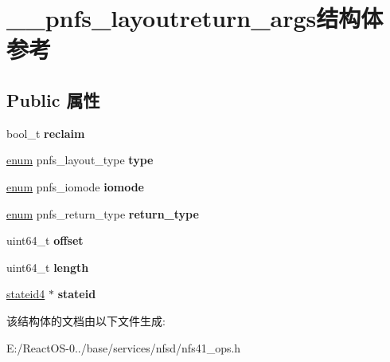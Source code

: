 \hypertarget{struct____pnfs__layoutreturn__args}{}\section{\+\_\+\+\_\+pnfs\+\_\+layoutreturn\+\_\+args结构体 参考}
\label{struct____pnfs__layoutreturn__args}
\subsection*{Public 属性}
\begin{DoxyCompactItemize}
\item 
\mbox{\label{struct____pnfs__layoutreturn__args_a3fe3e18d0b517374abcf3b1d301c3293}} 
bool\+\_\+t {\bfseries reclaim}
\item 
\mbox{\label{struct____pnfs__layoutreturn__args_a6531fe9065aabe4750a135e10154ca93}} 
\hyperlink{interfaceenum}{enum} pnfs\+\_\+layout\+\_\+type {\bfseries type}
\item 
\mbox{\label{struct____pnfs__layoutreturn__args_a8d90c3d85f922d65d5ce64e9c8df7bd2}} 
\hyperlink{interfaceenum}{enum} pnfs\+\_\+iomode {\bfseries iomode}
\item 
\mbox{\label{struct____pnfs__layoutreturn__args_a9d6a64109da0ef431dd2182a94a5b3c8}} 
\hyperlink{interfaceenum}{enum} pnfs\+\_\+return\+\_\+type {\bfseries return\+\_\+type}
\item 
\mbox{\label{struct____pnfs__layoutreturn__args_a98b46d4abdaebf2baf03138a874ec963}} 
uint64\+\_\+t {\bfseries offset}
\item 
\mbox{\label{struct____pnfs__layoutreturn__args_a81c53eeda89e90ec2e4c2d105a3df0ff}} 
uint64\+\_\+t {\bfseries length}
\item 
\mbox{\label{struct____pnfs__layoutreturn__args_abe2fddc5bad477d9317aedc4b4b68be6}} 
\hyperlink{struct____stateid4}{stateid4} $\ast$ {\bfseries stateid}
\end{DoxyCompactItemize}


该结构体的文档由以下文件生成\+:\begin{DoxyCompactItemize}
\item 
E\+:/\+React\+O\+S-\/0../base/services/nfsd/nfs41\+\_\+ops.\+h\end{DoxyCompactItemize}
